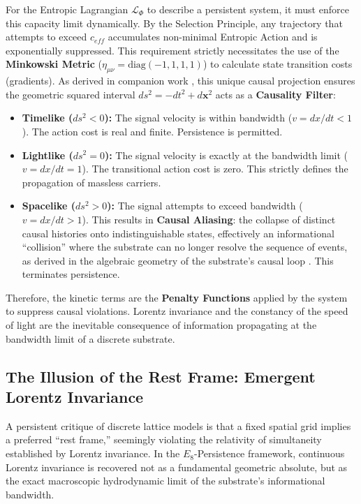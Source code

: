 For the Entropic Lagrangian $\mathcal{L}_{\Phi}$ to describe a persistent system, it must enforce this capacity limit dynamically. By the Selection Principle, any trajectory that attempts to exceed $c_{eff}$ accumulates non-minimal Entropic Action and is exponentially suppressed. This requirement strictly necessitates the use of the \textbf{Minkowski Metric} ($\eta_{\mu\nu} = \text{diag}(-1, 1, 1, 1)$) to calculate state transition costs (gradients). As derived in companion work \cite[Section IV.E]{meyer_informational_2026}, this unique causal projection ensures the geometric squared interval $ds^2 = -dt^2 + d\mathbf{x}^2$ acts as a \textbf{Causality Filter}:
\begin{itemize}
    \item \textbf{Timelike ($ds^2 < 0$):} The signal velocity is within bandwidth ($v = dx/dt < 1$). The action cost is real and finite. Persistence is permitted.
    \item \textbf{Lightlike ($ds^2 = 0$):} The signal velocity is exactly at the bandwidth limit ($v = dx/dt = 1$). The transitional action cost is zero. This strictly defines the propagation of massless carriers.
    \item \textbf{Spacelike ($ds^2 > 0$):} The signal attempts to exceed bandwidth ($v = dx/dt > 1$). This results in \textbf{Causal Aliasing}: the collapse of distinct causal histories onto indistinguishable states, effectively an informational ``collision'' where the substrate can no longer resolve the sequence of events, as derived in the algebraic geometry of the substrate's causal loop \cite{meyer_informational_2026}. This terminates persistence.
\end{itemize}

Therefore, the kinetic terms are the \textbf{Penalty Functions} applied by the system to suppress causal violations. Lorentz invariance and the constancy of the speed of light are the inevitable consequence of information propagating at the bandwidth limit of a discrete substrate.

\subsection{The Illusion of the Rest Frame: Emergent Lorentz Invariance}

A persistent critique of discrete lattice models is that a fixed spatial grid implies a preferred ``rest frame,'' seemingly violating the relativity of simultaneity established by Lorentz invariance. In the $E_8$-Persistence framework, continuous Lorentz invariance is recovered not as a fundamental geometric absolute, but as the exact macroscopic hydrodynamic limit of the substrate's informational bandwidth.

